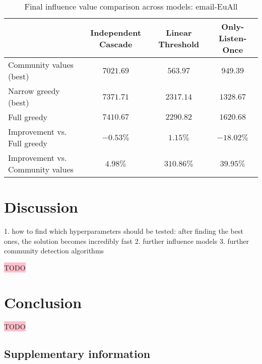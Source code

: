 \documentclass[pdflatex,sn-mathphys-num]{sn-jnl}
\begin{document}
\begin{table}[ht]
\caption{Final influence value comparison across models: email-EuAll}
\label{table_performance_comparison_emaileuall}
\begin{tabular}{@{}lccc@{}}
\toprule
& Independent Cascade & Linear Threshold & Only-Listen-Once \\
\midrule
Community values (best)\footnotemark[5] & $7021.69$ & $563.97$ & $949.39$ \\
Narrow greedy (best)\footnotemark[5] & $7371.71$ & $2317.14$ & $1328.67$ \\
Full greedy & $7410.67$ & $2290.82$ & $1620.68$ \\
\midrule
Improvement vs. Full greedy & $-0.53\%$ & $1.15\%$ & $-18.02\%$ \\
Improvement vs. Community values & $4.98\%$ & $310.86\%$ & $39.95\%$ \\
\midrule
\end{tabular}

\end{table}


\section{Discussion}\label{sec_discussion}

1. how to find which hyperparameters should be tested: after finding the best ones, the solution becomes incredibly fast
2. further influence models
3. further community detection algorithms

\colorbox{pink}{TODO}


\section{Conclusion}\label{sec_conclusion}

\colorbox{pink}{TODO}


\subsection*{Supplementary information}\label{subsec_supplementary}
\end{document}
